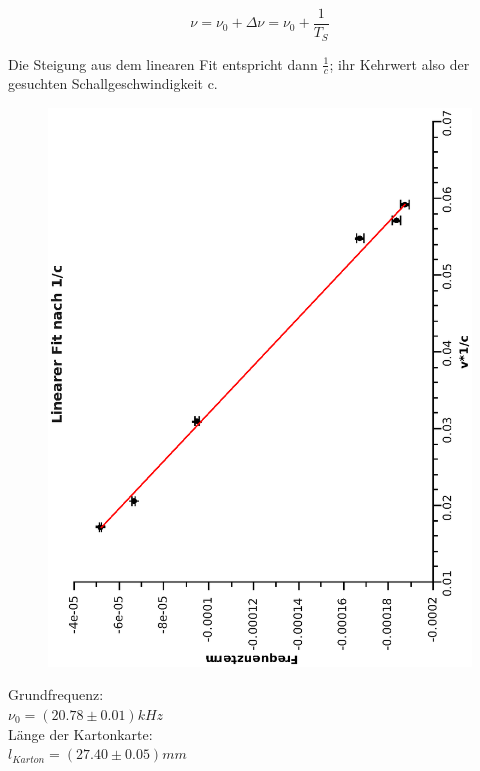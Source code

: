 \documentclass{article}
\begin{document}
\begin{equation}
\nu=\nu_0+\Delta \nu = \nu_0 + \frac{1}{T_S}
\end{equation}

Die Steigung aus dem linearen Fit entspricht dann $\frac{1}{c}$; ihr Kehrwert also der gesuchten Schallgeschwindigkeit c.

\begin{figure}
\includegraphics[scale=0.4,angle=-90]{dopplerfit.eps}
\end{figure}

Grundfrequenz:\\
$\nu_0=(20.78 \pm 0.01)\si{kHz}$\\
Länge der Kartonkarte:\\
$l_{Karton}=(27.40 \pm 0.05)\si{mm}$\\
\end{document}

